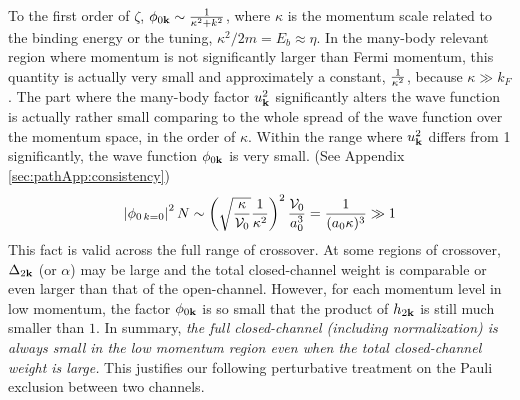 To  the first order of $\zeta$, $\phi_{0\mathbf{k}}\sim\frac{1}{\kappa^{2}+k^{2}}$, where $\kappa$ is the momentum scale related to the binding energy or the tuning, $\kappa^{2}/2m=E_{b}\approx\eta$.     In the many-body relevant region where momentum is not significantly larger than Fermi momentum, this quantity is actually very small and approximately a constant, $\frac{1}{\kappa^{2}}$, because $\kappa{}\gg{}k_{F}$.  The part where the many-body factor $u_{\mathbf{k}}^{2}$ significantly alters the wave function is actually rather small comparing to the whole spread of the wave function over the momentum space, in the order of $\kappa$.  Within the range where $u_{\mathbf{k}}^{2}$ differs from 1 significantly, the wave function $\phi_{0\mathbf{k}}$ is very small.  (See Appendix \ref{sec:pathApp:consistency})
\begin{equation*}
\left\lvert{\phi_{0\,k=0}}\right\rvert^{2}N\sim\left(\sqrt{\frac{\kappa}{\mathcal{V}_{0}}}\frac{1}{\kappa^{2}}\right)^{2}\frac{\mathcal{V}_{0}}{a_{0}^{3}}=\frac{1}{(a_{0}\kappa)^{3}}\gg1
\end{equation*}
 This fact is valid across the full range of crossover.  At some regions of crossover, $\Delta_{2\mathbf{k}}$ (or $\alpha$) may be large and the total closed-channel weight is comparable or even larger than that of the open-channel. However, for each momentum level in low  momentum, the factor $\phi_{0\mathbf{k}}$ is so small that the product of $h_{2\mathbf{k}}$ is still much smaller than $1$.  
In summary, \emph{the full closed-channel (including normalization) is always small in the low momentum region  even when the total closed-channel weight is large.}  This justifies our following perturbative treatment on the Pauli exclusion between two channels. 


